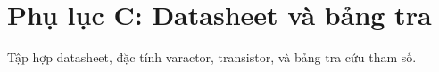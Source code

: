 \chapter{Phụ lục C: Datasheet và bảng tra}
Tập hợp datasheet, đặc tính varactor, transistor, và bảng tra cứu tham số.


